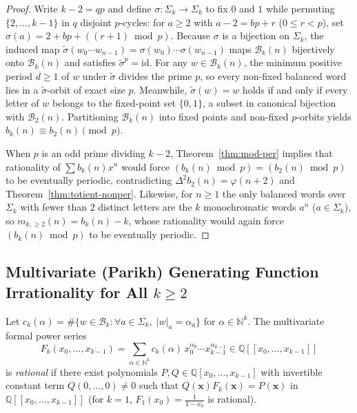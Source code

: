 \documentclass[11pt,a4paper]{article}
\theoremstyle{definition}
\newcommand{\N}{\mathbb{N}}
\newcommand{\Q}{\mathbb{Q}}
\begin{document}
\begin{proof}
Write $k - 2 = qp$ and define $\sigma : \Sigma_k \to \Sigma_k$ to fix $0$ and $1$ while permuting $\{2, \dots, k-1\}$ in $q$ disjoint $p$-cycles: for $a \ge 2$ with $a - 2 = bp + r$ ($0 \le r < p$), set $\sigma(a) = 2 + bp + ((r + 1) \bmod p)$. Because $\sigma$ is a bijection on $\Sigma_k$, the induced map $\tilde{\sigma}(w_0\cdots w_{n-1}) = \sigma(w_0)\cdots\sigma(w_{n-1})$ maps $\mathcal{B}_k(n)$ bijectively onto $\mathcal{B}_k(n)$ and satisfies $\tilde{\sigma}^p = \mathrm{id}$. For any $w \in \mathcal{B}_k(n)$, the minimum positive period $d \ge 1$ of $w$ under $\tilde{\sigma}$ divides the prime $p$, so every non-fixed balanced word lies in a $\tilde{\sigma}$-orbit of exact size $p$. Meanwhile, $\tilde{\sigma}(w) = w$ holds if and only if every letter of $w$ belongs to the fixed-point set $\{0, 1\}$, a subset in canonical bijection with $\mathcal{B}_2(n)$. Partitioning $\mathcal{B}_k(n)$ into fixed points and non-fixed $p$-orbits yields $b_k(n) \equiv b_2(n) \pmod p$.

When $p$ is an odd prime dividing $k - 2$, Theorem~\ref{thm:mod-per} implies that rationality of $\sum b_k(n)x^n$ would force $(b_k(n) \bmod p) = (b_2(n) \bmod p)$ to be eventually periodic, contradicting $\Delta^2 b_2(n) = \varphi(n + 2)$ and Theorem~\ref{thm:totient-nonper}. Likewise, for $n \ge 1$ the only balanced words over $\Sigma_k$ with fewer than $2$ distinct letters are the $k$ monochromatic words $a^n$ ($a \in \Sigma_k$), so $m_{k,\ge 2}(n) = b_k(n) - k$, whose rationality would again force $(b_k(n) \bmod p)$ to be eventually periodic.
\end{proof}

\subsection{Multivariate (Parikh) Generating Function Irrationality for All \texorpdfstring{$k \ge 2$}{k >= 2}}

Let $c_k(\alpha) = \#\{w \in \mathcal{B}_k : \forall a \in \Sigma_k,\; |w|_a = \alpha_a\}$ for $\alpha \in \N^k$. The multivariate formal power series
\[
  F_k(x_0,\dots,x_{k-1}) = \sum_{\alpha \in \N^k} c_k(\alpha)\, x_0^{\alpha_0}\cdots x_{k-1}^{\alpha_{k-1}} \in \Q[[x_0,\dots,x_{k-1}]]
\]
is \emph{rational} if there exist polynomials $P, Q \in \Q[x_0,\dots,x_{k-1}]$ with invertible constant term $Q(0,\dots,0) \neq 0$ such that $Q(\mathbf{x}) F_k(\mathbf{x}) = P(\mathbf{x})$ in $\Q[[x_0,\dots,x_{k-1}]]$ (for $k = 1$, $F_1(x_0) = \frac{1}{1 - x_0}$ is rational).
\end{document}
